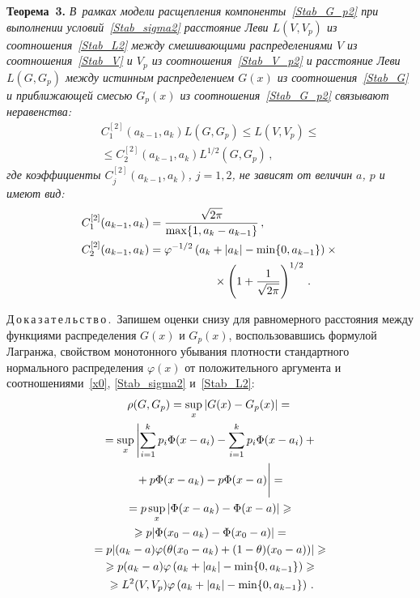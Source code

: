 \begin{multicols}{2}
\noindent
\textbf{Теорема~3.}
\textit{В~рамках модели расщепления
компоненты~\eqref{Stab_G_p2} при выполнении
условий~\eqref{Stab_sigma2} расстояние Леви $L(V,V_p)$
из соотношения~\eqref{Stab_L2} между смешивающими
распределениями $V$ из соотношения~\eqref{Stab_V} и $V_p$ из
соотношения~\eqref{Stab_V_p2} и расстояние Леви $L(G,G_p)$ между
истинным распределением $G(x)$ из соотношения~\eqref{Stab_G} и
приближающей смесью $G_p(x)$ из соотношения~\eqref{Stab_G_p2}
связывают неравенства:}
\begin{multline*}
C_1^{[2]}(a_{k-1},a_k)L(G,G_p)\leqslant
L(V,V_p)\leqslant{}\\
{}\leqslant
 C_2^{[2]}(a_{k-1},a_k)L^{1/2}(G,G_p)\,,
\end{multline*}
\textit{где коэффициенты $C_j^{[2]}(a_{k-1},a_k)$, $j=1,2$, не зависят
от величин $a$, $p$ и имеют вид:}
\begin{align}
\label{Stab_C21}
C_1^{[2]}(a_{k-1},a_k)&=\fr{\sqrt{2\pi}}{\max\{1,a_k-a_{k-1}\}}\,,\\
\label{Stab_C22}
C_2^{[2]}(a_{k-1},a_k)&=\varphi^{-1/2}
\left(a_k+|a_k|-\min\{0,a_{k-1}\}\right)\times{}\notag\\
&\hspace*{20mm}{}\times \left(1+\fr{1}{\sqrt{2\pi}}\right)^{1/2}\,.
\end{align}


\medskip

\noindent
Д\,о\,к\,а\,з\,а\,т\,е\,л\,ь\,с\,т\,в\,о\,.\ 
Запишем оценки снизу для равномерного расстояния между функциями
распределения $G(x)$ и $G_p(x)$, воспользовавшись формулой
Лагранжа, свойством монотонного убывания плотности стандартного
нормального распределения $\varphi(x)$ от положительного аргумента и
соотношениями~\eqref{x0}, \eqref{Stab_sigma2} и~\eqref{Stab_L2}:
\begin{multline*}
\rho(G,G_p)=\sup\limits_x|G(x)-G_p(x)|={}\\
{}=\sup\limits_x\left|\sum\limits_{i=1}^k
p_i\Phi(x-a_i)-\sum\limits_{i=1}^k
p_i\Phi(x-a_i)+{}\right.\\
\left.{}+p\Phi(x-a_k)-p\Phi(x-a)
\vphantom{\sum\limits_{i=1}^k}\right|={}\\
{}=p\sup\limits_x|\Phi(x-a_k)-\Phi(x-a)|\geqslant{}\\
{}\geqslant
p|\Phi(x_0-a_k)-\Phi(x_0-a)|={}\\
{}=p|(a_k-a)\varphi(\theta(x_0-a_k)+(1-\theta)(x_0-a))|\geqslant{}\\
{}\geqslant p(a_k-a)\varphi\left(a_k+|a_k|-\min\{0,a_{k-1}\}\right)\geqslant{}\\
{}\geqslant
L^2(V,V_p)\varphi\left(a_k+|a_k|-\min\{0,a_{k-1}\}\right)\,.
\end{multline*}


\end{multicols}

